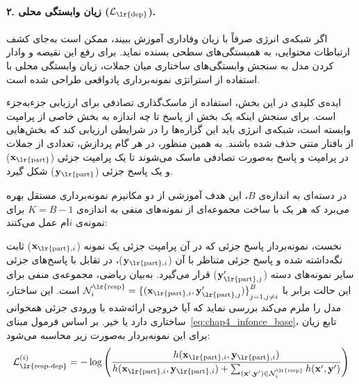 \paragraph{۲. زیان وابستگی محلی ($\mathcal{L}_{\text{\lr{dep}}}$).}
اگر شبکه‌ی انرژی صرفاً با زیان وفاداری آموزش ببیند، ممکن است به‌جای کشف ارتباطات محتوایی، به همبستگی‌های سطحی بسنده نماید. برای رفع این نقیصه و وادار کردن مدل به سنجش وابستگی‌های ساختاری میان جملات، زیان وابستگی محلی با استفاده از استراتژی نمونه‌برداری پادواقعی طراحی شده است.

ایده‌ی کلیدی در این بخش، استفاده از ماسک‌گذاری تصادفی برای ارزیابی جزء‌به‌جزء است. برای سنجش اینکه یک بخش از پاسخ تا چه اندازه به بخش خاصی از پرامپت وابسته است، شبکه‌ی انرژی باید این گزاره‌ها را در شرایطی ارزیابی کند که بخش‌هایی از بافتار متنی حذف شده باشند. به همین منظور، در هر گام پردازش، تعدادی از جملات در پرامپت و پاسخ به‌صورت تصادفی ماسک می‌شوند تا یک پرامپت جزئی ($\mathbf{x}_{\text{\lr{part}}}$) و یک پاسخ جزئی ($\mathbf{y}_{\text{\lr{part}}}$) شکل گیرد.

در دسته‌ای به اندازه‌ی $B$، این هدف آموزشی از دو مکانیزم نمونه‌برداری مستقل بهره می‌برد که هر یک با ساخت مجموعه‌ای از نمونه‌های منفی به اندازه‌ی $K = B-1$ برای نمونه‌ی $i$ام عمل می‌کنند:

نخست، نمونه‌بردار پاسخ جزئی که در آن پرامپت جزئی یک نمونه ($\mathbf{x}_{\text{\lr{part}}, i}$) ثابت نگه‌داشته شده و پاسخ جزئی متناظر با آن ($\mathbf{y}_{\text{\lr{part}}, i}$)، در تقابل با پاسخ‌های جزئی سایر نمونه‌های دسته ($\mathbf{y}'_{\text{\lr{part}}, j}$) قرار می‌گیرد. به‌بیان ریاضی، مجموعه‌ی منفی برای این حالت برابر با $\mathcal{N}^{\text{\lr{resp}}}_i = {\{(\mathbf{x}_{\text{\lr{part}}, i}, \mathbf{y}'_{\text{\lr{part}}, j})\}}_{j=1, j \neq i}^B$ است. این ساختار، مدل را ملزم می‌کند بررسی نماید که آیا خروجی ارائه‌شده با ورودی جزئی همخوانی ساختاری دارد یا خیر. بر اساس فرمول مبنای~\ref{eq:chap4_infonce_base}، تابع زیان برای این نمونه‌بردار به‌صورت زیر محاسبه می‌شود:
\begin{equation}\label{eq:chap4_loss_resp_dep}
    \mathcal{L}_{\text{\lr{resp-dep}}}^{(i)} = -\log \left( \frac{h(\mathbf{x}_{\text{\lr{part}}, i}, \mathbf{y}_{\text{\lr{part}}, i})}{h(\mathbf{x}_{\text{\lr{part}}, i}, \mathbf{y}_{\text{\lr{part}}, i}) + \sum_{(\mathbf{x}', \mathbf{y}') \in \mathcal{N}^{\text{\lr{resp}}}_i} h(\mathbf{x}', \mathbf{y}')} \right)
\end{equation}

